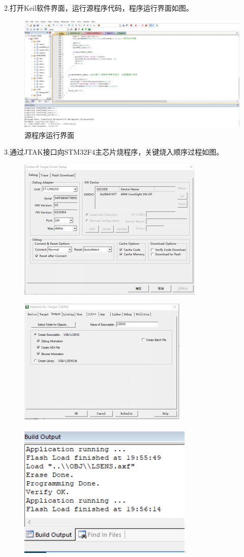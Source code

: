 \documentclass[UTF8]{ctexart}
\begin{document}
2.打开Keil软件界面，运行源程序代码，程序运行界面如图。
\begin{figure}[H]
	\centering
	\includegraphics[scale = 0.7]{11}
	\caption{源程序运行界面}
\end{figure}

3.通过JTAK接口向STM32F4主芯片烧程序，关键烧入顺序过程如图。
\begin{figure}[H]
	\centering
	\includegraphics[scale = 0.7]{12}
\end{figure}
\begin{figure}[H]
	\centering
	\includegraphics[scale = 0.7]{13}
\end{figure}
\begin{figure}[H]
	\centering
	\includegraphics[scale = 0.7]{14}
\end{figure}
\end{document}
